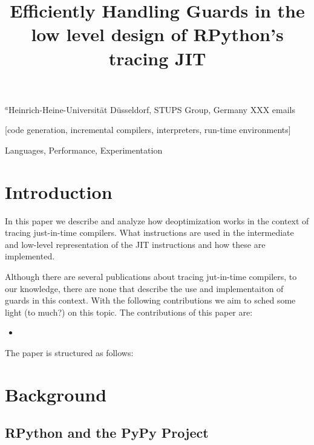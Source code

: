 \documentclass[10pt]{sigplanconf}
\begin{document}
\title{Efficiently Handling Guards in the low level design of RPython's tracing JIT}

           {$^a$Heinrich-Heine-Universität Düsseldorf, STUPS Group, Germany
           }
           {XXX emails}

\crdata{}

\maketitle

[code generation,
incremental compilers, interpreters, run-time environments]

\terms
Languages, Performance, Experimentation


\begin{abstract}

\end{abstract}


\section{Introduction}

In this paper we describe and analyze how deoptimization works in the context
of tracing just-in-time compilers. What instructions are used in the
intermediate and low-level representation of the JIT instructions and how these
are implemented.

Although there are several publications about tracing jut-in-time compilers, to
our knowledge, there are none that describe the use and implementaiton of
guards in this context. With the following contributions we aim to sched some
light (to much?) on this topic.
The contributions of this paper are:
\begin{itemize}
 \item
\end{itemize}

The paper is structured as follows:

\section{Background}
\label{sec:Background}

\subsection{RPython and the PyPy Project}
\label{sub:pypy}
\end{document}
